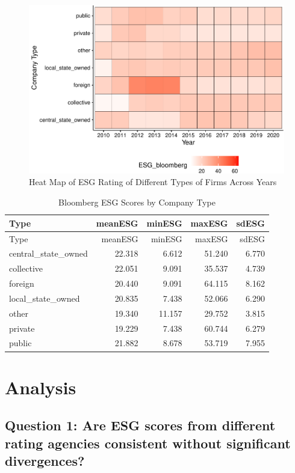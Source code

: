 \documentclass[
  12pt,
]{article}
\begin{document}
\begin{figure}
\centering
\includegraphics{FinalProject.Ruan.Muradov_files/figure-latex/heatmap-1.pdf}
\caption{Heat Map of ESG Rating of Different Types of Firms Across
Years}
\end{figure}

\begin{longtable}[]{@{}lrrrr@{}}
\caption{Bloomberg ESG Scores by Company Type}\tabularnewline
\toprule
Type & meanESG & minESG & maxESG & sdESG \\
\midrule
\endfirsthead
\toprule
Type & meanESG & minESG & maxESG & sdESG \\
\midrule
\endhead
central\_state\_owned & 22.318 & 6.612 & 51.240 & 6.770 \\
collective & 22.051 & 9.091 & 35.537 & 4.739 \\
foreign & 20.440 & 9.091 & 64.115 & 8.162 \\
local\_state\_owned & 20.835 & 7.438 & 52.066 & 6.290 \\
other & 19.340 & 11.157 & 29.752 & 3.815 \\
private & 19.229 & 7.438 & 60.744 & 6.279 \\
public & 21.882 & 8.678 & 53.719 & 7.955 \\
\bottomrule
\end{longtable}

\newpage

\hypertarget{analysis}{%
\section{Analysis}\label{analysis}}

\hypertarget{question-1-are-esg-scores-from-different-rating-agencies-consistent-without-significant-divergences}{%
\subsection{Question 1: Are ESG scores from different rating agencies
consistent without significant
divergences?}\label{question-1-are-esg-scores-from-different-rating-agencies-consistent-without-significant-divergences}}
\end{document}
